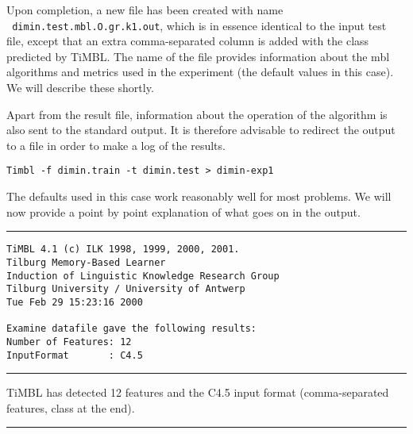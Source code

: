 \documentclass{report}
\begin{document}
Upon completion, a new file has been created with name\\ {\tt
dimin.test.mbl.O.gr.k1.out}, which is in essence identical to the
input test file, except that an extra comma-separated column is added
with the class predicted by TiMBL. The name of the file provides
information about the {\sc mbl} algorithms and metrics used in the
experiment (the default values in this case). We will describe these
shortly.

Apart from the result file, information about the operation of the
algorithm is also sent to the standard output. It is therefore 
advisable to redirect the output to a file in order to make a log of
the results.

{\small
\begin{verbatim}
Timbl -f dimin.train -t dimin.test > dimin-exp1
\end{verbatim}
}

The defaults used in this case work reasonably well for most problems.  We
will now provide a point by point explanation of what goes on in the
output.

\vspace{1cm}

\rule{\textwidth}{0.5mm}

{\small
\begin{verbatim}
TiMBL 4.1 (c) ILK 1998, 1999, 2000, 2001.
Tilburg Memory-Based Learner
Induction of Linguistic Knowledge Research Group
Tilburg University / University of Antwerp
Tue Feb 29 15:23:16 2000
 
Examine datafile gave the following results:
Number of Features: 12
InputFormat       : C4.5               
\end{verbatim}
}

\rule{\textwidth}{0.5mm}

\vspace{1cm}

TiMBL has detected 12 features and the C4.5 input format
(comma-separated features, class at the end).

\rule{\textwidth}{0.5mm}
\end{document}
